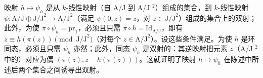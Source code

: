 映射 \(h \mapsto \psi_h\) 是从 \(k\)-线性映射（自 A/J 到 A/J \(^2\)）组成的集合，到 \(k\)-线性映射 \(\psi : \text{A/J} \oplus \text{J/J}^2 \longrightarrow \text{A/J}^2\)（满足 \(\psi(0,z) = z\)，对 \(z \in \text{J/J}^2\)）组成的集合上的双射；此外，为使 \(\pi \circ \psi_h = \text{pr}_1\)，必须且只需 \(\pi \circ h = \text{Id}_{\text{A/J}}\)，即有 \(z \equiv h(\pi(z)) \pmod{\text{J/J}^2}\)（对每个 \(z \in \text{A/J}^2\)）。设这些条件满足。为使 \(h\) 是环同态，必须且只需 \(\psi_h\) 亦然；此外，同态 \(\psi_h\) 是双射的：其逆映射把元素 \(z\)（A/J \(^2\) 中的）对应为偶 \((\pi(z), z - h(\pi(z)))\)。这就证明了映射 \(h \mapsto \psi_h\) 在陈述中所述后两个集合之间诱导出双射。

